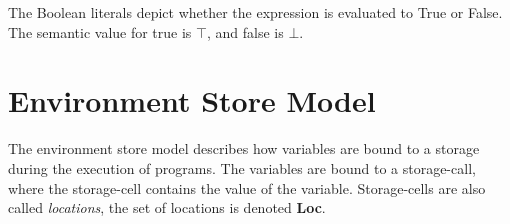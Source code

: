 	
	The Boolean literals depict whether the expression is evaluated to True or False. The semantic value for true is \begin{math} \top \end{math}, and false is \begin{math} \bot. \end{math}
	
	
	
	
	
	
	
	
	
	
	
	
	
	
	
	
	
	
	
	
	
	
	
	
	
	
	
	
	
	
	
	
	
	
	
	
	
	\section{Environment Store Model}
	
	
	The environment store model describes how variables are bound to a storage during the execution of programs. The variables are bound to a storage-call, where the storage-cell contains the value of the variable. Storage-cells are also called \textit{locations}, the set of locations is denoted \textbf{Loc}.
	
	
	
	
	
